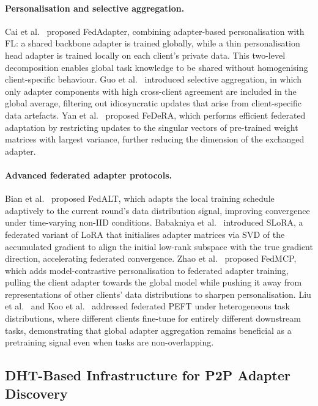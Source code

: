 \paragraph{Personalisation and selective aggregation.}
Cai et al.~\cite{CaiFedAdapter2023} proposed FedAdapter, combining adapter-based personalisation
with FL: a shared backbone adapter is trained globally, while a thin personalisation
head adapter is trained locally on each client's private data. This two-level
decomposition enables global task knowledge to be shared without homogenising
client-specific behaviour. Guo et al.~\cite{GuoSelective2025} introduced selective aggregation,
in which only adapter components with high cross-client agreement are included in the
global average, filtering out idiosyncratic updates that arise from client-specific
data artefacts. Yan et al.~\cite{YanFeDeRA2024} proposed FeDeRA, which performs efficient
federated adaptation by restricting updates to the singular vectors of pre-trained
weight matrices with largest variance, further reducing the dimension of the exchanged
adapter.

\paragraph{Advanced federated adapter protocols.}
Bian et al.~\cite{BianFedALT2025} proposed FedALT, which adapts the local training schedule
adaptively to the current round's data distribution signal, improving convergence
under time-varying non-IID conditions. Babakniya et al.~\cite{Babakniya2023} introduced SLoRA,
a federated variant of LoRA that initialises adapter matrices via SVD of the
accumulated gradient to align the initial low-rank subspace with the true gradient
direction, accelerating federated convergence. Zhao et al.~\cite{ZhaoFedMCP2024} proposed
FedMCP, which adds model-contrastive personalisation to federated adapter training,
pulling the client adapter towards the global model while pushing it away from
representations of other clients' data distributions to sharpen personalisation.
Liu et al.~\cite{LiuAdaptive2024} and Koo et al.~\cite{KooBai2025} addressed federated PEFT under
heterogeneous task distributions, where different clients fine-tune for entirely
different downstream tasks, demonstrating that global adapter aggregation remains
beneficial as a pretraining signal even when tasks are non-overlapping.

\subsection{DHT-Based Infrastructure for P2P Adapter Discovery}
\label{sec:p2p_federated:dht}

